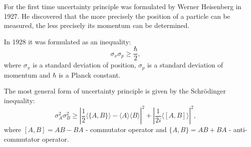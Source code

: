 \documentclass[11pt]{article}
\begin{document}
For the first time uncertainty principle was formulated by Werner Heisenberg in 1927. He discovered that the more precisely the position of a particle can be measured, the less precisely its momentum can be determined.

In 1928 it was formulated as an inequality:
\[
\sigma_x\sigma_p \geq \frac{\hbar}{2},
\]
where $\sigma_x$ is a standard deviation of position, $\sigma_p$ is a standard deviation of momentum and $\hbar$ is a Planck constant.

The most general form of uncertainty principle is given by the Schr\"{o}dinger inequality:
\begin{equation}
\sigma_A^2\sigma_B^2 \geq \left| \frac{1}{2}\langle\{A, B\}\rangle - \langle A\rangle\langle B\rangle \right|^2 + \left| \frac{1}{2i}\langle [A, B]\rangle\right|^2,
\label{eq:Schrodinger_ineq}
\end{equation}
where $[A, B] = AB - BA$ - commutator operator and $\{A, B\} = AB + BA$ - anti-commutator operator.
\end{document}
